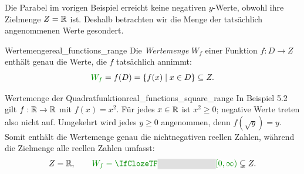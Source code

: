 \par\noindent\begin{minipage}{\linewidth}
Die Parabel im vorigen Beispiel erreicht keine negativen $y$-Werte, obwohl
ihre Zielmenge $Z=\mathbb{R}$ ist. Deshalb betrachten wir die Menge der tatsächlich
angenommenen Werte gesondert.
\begin{DefinitionBox}{\textcolor{green!55!black}{Wertemenge}}{real_functions_range}
  Die \emph{\textcolor{green!55!black}{Wertemenge}}  $W_f$ einer
  Funktion $f:D\to Z$ enthält genau die Werte, die $f$ tatsächlich annimmt:
  \[
    {\color{green!55!black}W_f}=f(D)=\{f(x)\mid x\in D\}\subseteq Z.
  \]
  \par\noindent\centering
  \par
\end{DefinitionBox}
\begin{ExampleBox}[before skip=0.3\baselineskip]{\textcolor{green!55!black}{Wertemenge} der Quadratfunktion}{real_functions_square_range}
  In Beispiel 5.2 gilt $f:\mathbb{R}\to\mathbb{R}$ mit $f(x)=x^2$.
  Für jedes $x\in\mathbb{R}$ ist $x^2\ge0$; negative Werte treten also nicht auf.
  Umgekehrt wird jedes $y\ge0$ angenommen, denn $f(\sqrt y)=y$.
  Somit enthält die \textcolor{green!55!black}{Wertemenge} genau die nichtnegativen
  reellen Zahlen, während die Zielmenge alle reellen Zahlen umfasst:
  \[
    Z=\R,\qquad
    {\color{green!55!black}W_f=\Cloze{2.5cm}{[0,\infty)}}\subsetneq Z.
  \]
  \par\smallskip\noindent\centering
  \par
\end{ExampleBox}
\end{minipage}

